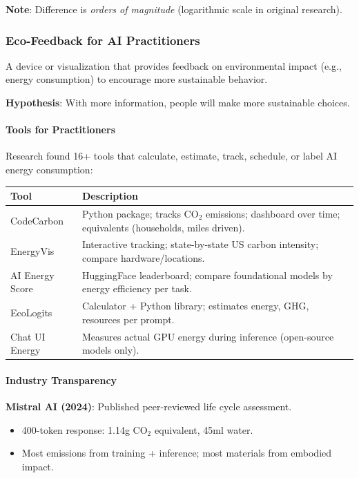 \textbf{Note}: Difference is \textit{orders of magnitude} (logarithmic scale in original research).

\subsubsection*{Eco-Feedback for AI Practitioners}

\begin{defbox}
A device or visualization that provides feedback on environmental impact (e.g., energy consumption) to encourage more sustainable behavior.

\textbf{Hypothesis}: With more information, people will make more sustainable choices.
\end{defbox}

\paragraph*{Tools for Practitioners}

Research found 16+ tools that calculate, estimate, track, schedule, or label AI energy consumption:

\begin{center}
\renewcommand{\arraystretch}{1.3}
\begin{tabular}{@{} l p{8cm} @{}}
\toprule
\textbf{Tool} & \textbf{Description} \\
\midrule
CodeCarbon & Python package; tracks CO$_2$ emissions; dashboard over time; equivalents (households, miles driven). \\
EnergyVis & Interactive tracking; state-by-state US carbon intensity; compare hardware/locations. \\
AI Energy Score & HuggingFace leaderboard; compare foundational models by energy efficiency per task. \\
EcoLogits & Calculator + Python library; estimates energy, GHG, resources per prompt. \\
Chat UI Energy & Measures actual GPU energy during inference (open-source models only). \\
\bottomrule
\end{tabular}
\end{center}

\paragraph*{Industry Transparency}

\textbf{Mistral AI (2024)}: Published peer-reviewed life cycle assessment.
\begin{itemize}
  \item 400-token response: 1.14g CO$_2$ equivalent, 45ml water.
  \item Most emissions from training + inference; most materials from embodied impact.
\end{itemize}

